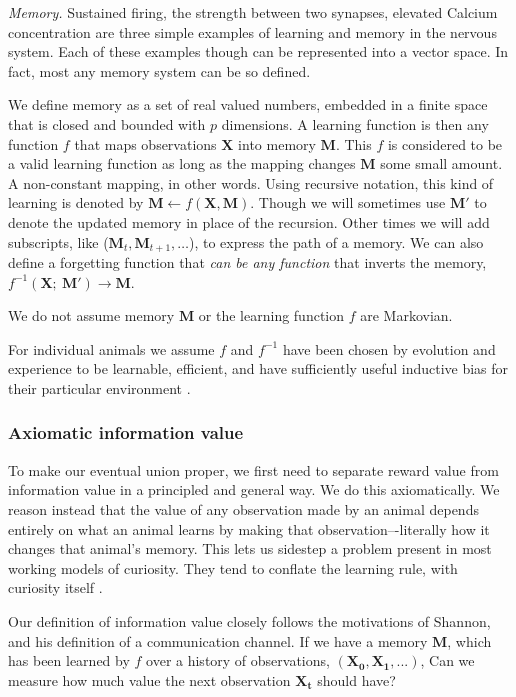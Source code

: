 \emph{Memory.} Sustained firing, the strength between two synapses, elevated Calcium concentration are three simple examples of learning and memory in the nervous system. Each of these examples though can be represented into a vector space. In fact, most any memory system can be so defined. 

We define memory as a set of real valued numbers, embedded in a finite space that is closed and bounded with $p$ dimensions. A learning function is then any function $f$ that maps observations $\mathbf{X}$ into memory $\mathbf{M}$. This $f$ is considered to be a valid learning function as long as the mapping changes $\mathbf{M}$ some small amount. A non-constant mapping, in other words. Using recursive notation, this kind of learning is denoted by $\mathbf{M} \leftarrow f(\mathbf{X},\mathbf{M}) $. Though we will sometimes use $\mathbf{M'}$ to denote the updated memory in place of the recursion. Other times we will add subscripts, like ($\mathbf{M}_t,\mathbf{M}_{t+1},\ldots$), to express the path of a memory. We can also define a forgetting function that \textit{can be any function} that inverts the memory, $f^{-1}(\mathbf{X};\ \mathbf{M}') \rightarrow \mathbf{M}$. 

We do not assume memory $\mathbf{M}$ or the learning function $f$ are Markovian.

For individual animals we assume $f$ and $f^{-1}$ have been chosen by evolution and experience to be learnable, efficient, and have sufficiently useful inductive bias for their particular environment \cite{Valiant1984,Thrun1992a}. 


\subsubsection*{Axiomatic information value} 
To make our eventual union proper, we first need to separate reward value from information value in a principled and general way. We do this axiomatically.
We reason instead that the value of any observation made by an animal depends entirely on what an animal learns by making that observation–-literally how it changes that animal's memory. This lets us sidestep a problem present in most working models of curiosity. They tend to conflate the learning rule, with curiosity itself \cite{Schmidhuber1991b,Oudeyer2018a,Burda2018,Zhang2013,deAbril2018,Zhou2020,Schwartenbeck2019,Wilson2014a,Lehman2011,Velez2014}.

Our definition of information value closely follows the motivations of Shannon, and his definition of a communication channel. If we have a memory $\mathbf{M}$, which has been learned by $f$ over a history of observations, $(\mathbf{X_0},\mathbf{X_1},...)$, Can we measure how much value the next observation $\mathbf{X_t}$ should have? 

